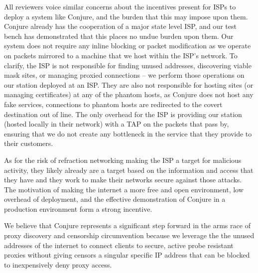 All reviewers voice similar concerns about the incentives present for ISPs to deploy a system like
Conjure, and the burden that this may impose upon them. Conjure already has the cooperation of a 
major state level ISP, and our test bench has demonstrated that this places
no undue burden upon them. Our system does not require any inline blocking or packet modification 
as we operate on packets mirrored to a machine that we host within the ISP's network. 
To clarify, the ISP is not responsible for finding unused addresses, discovering viable mask sites, 
or managing proxied connections -- we perform those operations on our station deployed
at an ISP. They are also not responsible for hosting sites (or managing certificates) at any of the 
phantom hosts, as Conjure does not host any fake services, connections to phantom hosts are 
redirected to the covert destination out of line. The only overhead 
for the ISP is providing our station (hosted locally in their network) with a TAP on the packets that 
pass by, ensuring that we do not create any bottleneck in the service that they provide to their customers. 

As for the risk of refraction networking making the ISP a target for malicious activity, they likely already
are a target based on the information and access that they have and they work to make their networks 
secure against those attacks. The motivation of making the internet a more free and open environment,
low overhead of deployment, and the effective demonstration of Conjure in a production environment 
form a strong incentive. 

We believe that Conjure represents a significant step forward in the arms race of proxy
discovery and censorship circumvention because we leverage the the unused addresses of the internet
to connect clients to secure, active probe resistant proxies without giving censors a singular 
specific IP address that can be blocked to inexpensively deny proxy access.

